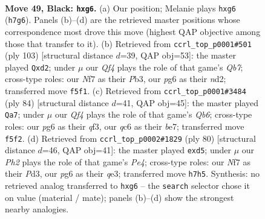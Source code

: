 \documentclass[11pt]{article}
\begin{document}
\clearpage

\begin{figure}[p]\centering
\begin{subfigure}{0.46\textwidth}\centering
\resizebox{\linewidth}{!}{%
\newchessgame
\chessboard[
  setfen={1k6/p1p2npp/1pQ3P1/2p2q2/8/2P5/1P6/K7 b - - 2 49},
  showmover=false,
  pgfstyle=straightmove, color=movearrow, markmove={h7-g6}
]}
\caption{}
\end{subfigure}\hfill
\begin{subfigure}{0.46\textwidth}\centering
\resizebox{\linewidth}{!}{%
\newchessgame
\chessboard[
  setfen={6k1/5p1p/4pQp1/4P3/3P4/1p4P1/1q1NBK1P/8 b - - 0 52},
  showmover=false,
  pgfstyle=straightmove, color=movearrow, markmove={b2-d2}
]}
\caption{}
\end{subfigure}
\\[4pt]
\begin{subfigure}{0.46\textwidth}\centering
\resizebox{\linewidth}{!}{%
\newchessgame
\chessboard[
  setfen={8/4bk1p/1Q1p4/4p3/2P2p1P/5qP1/5PNK/8 w - - 15 43},
  showmover=false,
  pgfstyle=straightmove, color=movearrow, markmove={b6-a7}
]}
\caption{}
\end{subfigure}\hfill
\begin{subfigure}{0.46\textwidth}\centering
\resizebox{\linewidth}{!}{%
\newchessgame
\chessboard[
  setfen={8/8/2Q1ppk1/1P1pp2p/4P3/3Pq2P/6P1/7K w - - 0 41},
  showmover=false,
  pgfstyle=straightmove, color=movearrow, markmove={e4-d5}
]}
\caption{}
\end{subfigure}
\caption{\textbf{Move 49, Black: \texttt{hxg6}.} (a) Our position; Melanie plays \texttt{hxg6} (\texttt{h7g6}). Panels (b)--(d) are the retrieved master positions whose correspondence most drove this move (highest QAP objective among those that transfer to it). (b) Retrieved from \texttt{ccrl\_top\_p0001\#501} (ply 103) [structural distance $d$=39, QAP obj=53]: the master played \texttt{Qxd2}; under $\mu$ our \emph{Qf4} plays the role of that game's \emph{Qb7}; cross-type roles: our \emph{N}f7 as their \emph{P}b3, our \emph{p}g6 as their \emph{n}d2; transferred move \texttt{f5f1}. (c) Retrieved from \texttt{ccrl\_top\_p0001\#3484} (ply 84) [structural distance $d$=41, QAP obj=45]: the master played \texttt{Qa7}; under $\mu$ our \emph{Qf4} plays the role of that game's \emph{Qb6}; cross-type roles: our \emph{p}g6 as their \emph{q}f3, our \emph{q}c6 as their \emph{b}e7; transferred move \texttt{f5f2}. (d) Retrieved from \texttt{ccrl\_top\_p0002\#1829} (ply 80) [structural distance $d$=46, QAP obj=41]: the master played \texttt{exd5}; under $\mu$ our \emph{Ph2} plays the role of that game's \emph{Pe4}; cross-type roles: our \emph{N}f7 as their \emph{P}d3, our \emph{p}g6 as their \emph{q}e3; transferred move \texttt{h7h5}. Synthesis: no retrieved analog transferred to \texttt{hxg6} -- the \texttt{search} selector chose it on value (material / mate); panels (b)--(d) show the strongest nearby analogies.}
\label{fig:thought-m97}
\end{figure}
\end{document}
